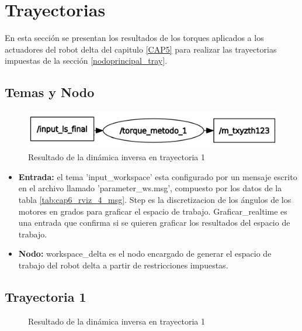         
        
        
        
\newpage


\section{Trayectorias}
    En esta sección se presentan los resultados de los torques aplicados a los actuadores del robot delta del capitulo \ref{CAP5} para realizar las trayectorias impuestas de la sección \ref{nodoprincipal_tray}.

    \subsection{Temas y Nodo}
    
    \begin{figure}[h]
            \centering
            \includegraphics[width=1.0\textwidth]{Main/Chapter7/Images7/nodo_3.jpg}
            \caption{Resultado de la dinámica inversa en trayectoria 1}
            \label{f:cap7_tray_5_nodo}
    \end{figure}
    
    \begin{itemize}
        \item {\textbf{Entrada:}  el tema 'input\_workspace' esta configurado por un mensaje escrito en el archivo llamado 'parameter\_ws.msg', compuesto por los datos de la tabla \ref{tab:cap6_rviz_4_msg}. Step es la discretizacion de los ángulos de los motores en grados para graficar el espacio de trabajo. Graficar\_realtime es una entrada que confirma si se quieren graficar los resultados del espacio de trabajo. }
        \item {\textbf{Nodo:} workspace\_delta es el nodo encargado de generar el espacio de trabajo del robot delta a partir de restricciones impuestas.}
    \end{itemize}
    
    \subsection{Trayectoria 1}
    
        \begin{figure}[h]
            \centering
            
            \caption{Resultado de la dinámica inversa en trayectoria 1}
            \label{f:cap7_tray1}
        \end{figure}

